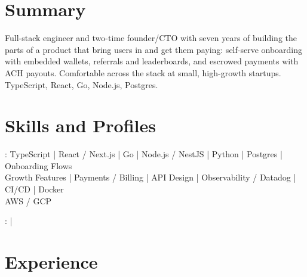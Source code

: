 \documentclass[print]{jack-resume}
\begin{document}
\pagecolor{darkmodeBackground}


\begin{minipage}[t][1cm][t]{.03\textwidth}
    \hfill
\end{minipage}

\section{Summary}
Full-stack engineer and two-time founder/CTO with seven years of building the parts of a product that bring users in and get them paying: self-serve onboarding with embedded wallets, referrals and leaderboards, and escrowed payments with ACH payouts. Comfortable across the stack at small, high-growth startups. TypeScript, React, Go, Node.js, Postgres.
\sectionsep

\section{Skills and Profiles}
:
TypeScript \hfill | \hfill
React / Next.js \hfill | \hfill
Go \hfill | \hfill
Node.js / NestJS \hfill | \hfill
Python \hfill | \hfill
Postgres \hfill | \hfill
Onboarding Flows \\
\hspace{1.0cm} Growth Features \hfill | \hfill
Payments / Billing \hfill | \hfill
API Design \hfill | \hfill
Observability / Datadog \hfill | \hfill
CI/CD \hfill | \hfill
Docker \\
\hspace{1.0cm} AWS / GCP \\

\raggedright{
    :
      \href{https://www.linkedin.com/in/jack-sturtevant/}{ \ExternalLink} |
     \href{https://github.com/jacksturt}{ \ExternalLink}}

\section{Experience}
\end{document}
